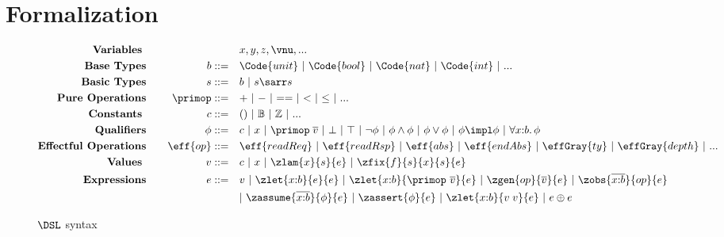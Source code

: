 \section{Formalization}\label{sec:formal}

\begin{figure}[t!]
  \vspace{-.3cm}
{\footnotesize
  \begin{alignat*}{2}
    \text{\textbf{Variables }}& \quad &\quad& x, y, z, \vnu, ...
    \\\text{\textbf{Base Types}}& \quad & b  ::= \quad &  \Code{unit} ~|~ \Code{bool} ~|~ \Code{nat} ~|~ \Code{int} ~|~ ...
    \\\text{\textbf{Basic Types}}& \quad & s  ::= \quad &  b ~|~ s\sarr s
    \\\text{\textbf{Pure Operations}}& \quad & \primop ::= \quad & {+} ~|~ {-} ~|~ {==} ~|~ {<} ~|~ {\leq} ~|~ ...
    \\ \text{\textbf{Constants }}& \quad &c ::= \quad & () ~|~ \mathbb{B} ~|~ \mathbb{Z} ~|~ ...
    \\ \text{\textbf{Qualifiers}}& \quad & \phi ::= \quad & c ~|~ x ~|~ \primop\;\overline{v} ~|~ \bot ~|~ \top  ~|~ \neg \phi ~|~ \phi \land \phi ~|~ \phi \lor \phi ~|~ \phi \impl \phi ~|~ \forall x{:}b.\, \phi
    \\\text{\textbf{Effectful Operations}}& \quad & \eff{op} ::= \quad & \eff{readReq} ~|~ \eff{readRsp} ~|~ \eff{abs} ~|~ \eff{endAbs} ~|~ \effGray{ty} ~|~ \effGray{depth} ~|~ ...
    \\ \text{\textbf{Values }}& \quad  & v ::= \quad & c ~|~ x ~|~ \zlam{x}{s}{e} ~|~ \zfix{f}{s}{x}{s}{e}
    \\ \text{\textbf{Expressions}}& \quad & e ::=\quad & v ~|~ \zlet{x{:}b}{e}{e} ~|~ \zlet{x{:}b}{\primop\ \overline{v}}{e} ~|~ \zgen{op}{\overline{v}}{e} ~|~ \zobs{\overline{x{:}b}}{op}{e}
    \\ & & \quad & |~  \zassume{\overline{x{:}b}}{\phi}{e} ~|~ \zassert{\phi}{e} ~|~ \zlet{x{:}b}{v\;v}{e}  ~|~ e \oplus e
  \end{alignat*}}
\vspace*{-.25in}
\caption{$\DSL$ syntax }
\label{fig:term-syntax}
\vspace*{-.1in}
\end{figure}

